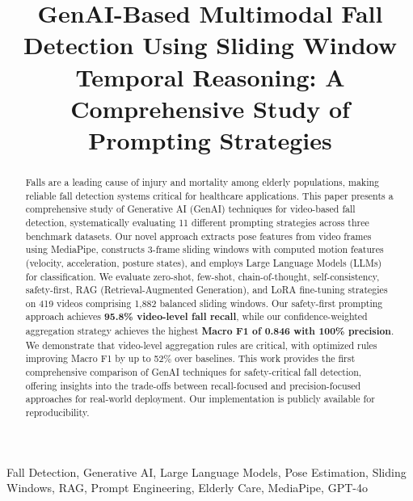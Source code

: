 \documentclass[conference]{IEEEtran}
\begin{document}
\title{GenAI-Based Multimodal Fall Detection Using Sliding Window Temporal Reasoning: A Comprehensive Study of Prompting Strategies}

\author{
}

\maketitle

\begin{abstract}
Falls are a leading cause of injury and mortality among elderly populations, making reliable fall detection systems critical for healthcare applications. This paper presents a comprehensive study of Generative AI (GenAI) techniques for video-based fall detection, systematically evaluating 11 different prompting strategies across three benchmark datasets. Our novel approach extracts pose features from video frames using MediaPipe, constructs 3-frame sliding windows with computed motion features (velocity, acceleration, posture states), and employs Large Language Models (LLMs) for classification. We evaluate zero-shot, few-shot, chain-of-thought, self-consistency, safety-first, RAG (Retrieval-Augmented Generation), and LoRA fine-tuning strategies on 419 videos comprising 1,882 balanced sliding windows. Our safety-first prompting approach achieves \textbf{95.8\% video-level fall recall}, while our confidence-weighted aggregation strategy achieves the highest \textbf{Macro F1 of 0.846 with 100\% precision}. We demonstrate that video-level aggregation rules are critical, with optimized rules improving Macro F1 by up to 52\% over baselines. This work provides the first comprehensive comparison of GenAI techniques for safety-critical fall detection, offering insights into the trade-offs between recall-focused and precision-focused approaches for real-world deployment. Our implementation is publicly available for reproducibility.
\end{abstract}

\begin{IEEEkeywords}
Fall Detection, Generative AI, Large Language Models, Pose Estimation, Sliding Windows, RAG, Prompt Engineering, Elderly Care, MediaPipe, GPT-4o
\end{IEEEkeywords}
\end{document}
